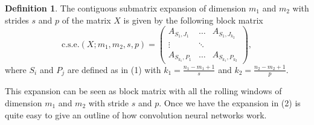 \documentclass{article}
\theoremstyle{definition}
\newtheorem{definition}{Definition}
\begin{document}
\begin{definition}
The contiguous submatrix expansion of dimension $m_1$ and $m_2$ with strides $s$ and $p$ of the matrix $X$ is given by the following block matrix
\begin{equation}
\mbox{c.s.e.}(X;m_1,m_2,s,p) = \begin{pmatrix}
A_{S_1,J_1}&\dots& A_{S_1,J_{k_2}}\\
\vdots & \ddots & \\
A_{S_{k_1},P_1}&\dots&A_{S_{k_1},P_{k_2}}
\end{pmatrix},
\end{equation}
where  $S_i$ and $P_j$ are defined as in (1) with $k_1= \frac{n_1-m_1+1}{s}$ and $k_2=\frac{n_2-m_2+1}{p}$.
\end{definition}
\noindent
This expansion can be seen as block matrix with all the rolling windows of dimension $m_1$ and $m_2$ with stride $s$ and $p$. Once we have the expansion in (2) is quite easy to give an outline of how convolution neural networks work.
\end{document}

